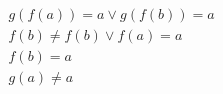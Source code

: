 \begin{align*}
%
& g(f(a)) = a \lor g(f(b)) = a
~\\~
& f(b)  \neq  f(b) \lor f(a) = a
~\\~
& f(b) = a
~\\~
& g(a)  \neq  a
%
\end{align*}
